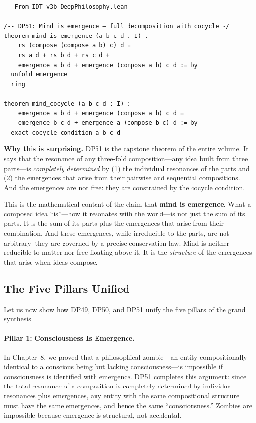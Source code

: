 \begin{lstlisting}
-- From IDT_v3b_DeepPhilosophy.lean

/-- DP51: Mind is emergence — full decomposition with cocycle -/
theorem mind_is_emergence (a b c d : I) :
    rs (compose (compose a b) c) d =
    rs a d + rs b d + rs c d +
    emergence a b d + emergence (compose a b) c d := by
  unfold emergence
  ring

theorem mind_cocycle (a b c d : I) :
    emergence a b d + emergence (compose a b) c d =
    emergence b c d + emergence a (compose b c) d := by
  exact cocycle_condition a b c d
\end{lstlisting}

\begin{surprisebox}
\noindent\textbf{Why this is surprising.}
DP51 is the capstone theorem of the entire volume.  It says that the
resonance of any three-fold composition---any idea built from three
parts---is \emph{completely determined} by (1) the individual resonances of
the parts and (2) the emergences that arise from their pairwise and
sequential compositions.  And the emergences are not free: they are
constrained by the cocycle condition.

This is the mathematical content of the claim that \textbf{mind is emergence}.
What a composed idea ``is''---how it resonates with the world---is not just
the sum of its parts.  It is the sum of its parts plus the emergences that
arise from their combination.  And these emergences, while irreducible to
the parts, are not arbitrary: they are governed by a precise conservation
law.  Mind is neither reducible to matter nor free-floating above it.  It
is the \emph{structure} of the emergences that arise when ideas compose.
\end{surprisebox}

\subsection{The Five Pillars Unified}

Let us now show how DP49, DP50, and DP51 unify the five pillars of the
grand synthesis.

\paragraph{Pillar 1: Consciousness Is Emergence.}
In Chapter~8, we proved that a philosophical zombie---an entity compositionally
identical to a conscious being but lacking consciousness---is impossible if
consciousness is identified with emergence.  DP51 completes this argument:
since the total resonance of a composition is completely determined by
individual resonances plus emergences, any entity with the same compositional
structure must have the same emergences, and hence the same ``consciousness.''
Zombies are impossible because emergence is structural, not accidental.

